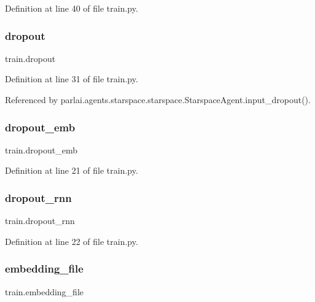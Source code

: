Definition at line 40 of file train.\+py.

\mbox{\label{namespacetrain_a5bbd7206662c6095997e002d6acc1c0b}} 
\subsubsection{\texorpdfstring{dropout}{dropout}}
{\footnotesize\ttfamily train.\+dropout}



Definition at line 31 of file train.\+py.



Referenced by parlai.\+agents.\+starspace.\+starspace.\+Starspace\+Agent.\+input\+\_\+dropout().

\mbox{\label{namespacetrain_a49c9baf0b2032b28aed1f9076b58a13a}} 
\subsubsection{\texorpdfstring{dropout\+\_\+emb}{dropout\_emb}}
{\footnotesize\ttfamily train.\+dropout\+\_\+emb}



Definition at line 21 of file train.\+py.

\mbox{\label{namespacetrain_a1093b38b8f4b2f51bb5d9ed733350a74}} 
\subsubsection{\texorpdfstring{dropout\+\_\+rnn}{dropout\_rnn}}
{\footnotesize\ttfamily train.\+dropout\+\_\+rnn}



Definition at line 22 of file train.\+py.

\mbox{\label{namespacetrain_a058963e0e147d3f21c9f5ee0372cd832}} 
\subsubsection{\texorpdfstring{embedding\+\_\+file}{embedding\_file}}
{\footnotesize\ttfamily train.\+embedding\+\_\+file}



